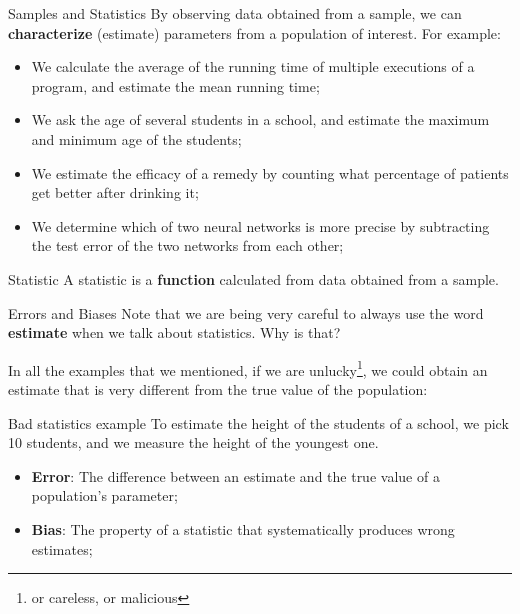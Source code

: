 \begin{frame}{Samples and Statistics}
  By observing data obtained from a sample, we can {\bf characterize} (estimate) parameters from a population of interest. For example:\bigskip

  \begin{itemize}
    \item We calculate the average of the running time of multiple executions of a program, and estimate the mean running time;
    \item We ask the age of several students in a school, and estimate the maximum and minimum age of the students;
    \item We estimate the efficacy of a remedy by counting what percentage of patients get better after drinking it;
    \item We determine which of two neural networks is more precise by subtracting the test error of the two networks from each other;
  \end{itemize}\bigskip

  \begin{block}{Statistic}
    A statistic is a {\bf function} calculated from data obtained from a sample.
  \end{block}
\end{frame}

\begin{frame}{Errors and Biases}
  Note that we are being very careful to always use the word {\bf estimate} when we talk about statistics. Why is that?
  \bigskip

  In all the examples that we mentioned, if we are unlucky\footnote{or careless, or malicious}, we could obtain an estimate that is very different from the true value of the population:
  \begin{alertblock}{Bad statistics example}
    To estimate the height of the students of a school, we pick 10 students, and we measure the height of the youngest one.
  \end{alertblock}\medskip
  \begin{itemize}
    \item {\bf Error}: The difference between an estimate and the true value of a population's parameter;
    \item {\bf Bias}: The property of a statistic that systematically produces wrong estimates;
  \end{itemize}
\end{frame}

